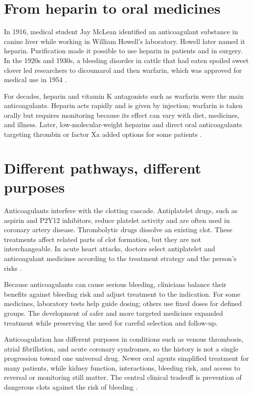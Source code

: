 \documentclass[12pt,oneside]{book}
\begin{document}
\section{From heparin to oral medicines}
In 1916, medical student Jay McLean identified an anticoagulant substance
in canine liver while working in William Howell's laboratory. Howell later
named it heparin. Purification made it possible to use heparin in patients
and in surgery. In the 1920s and 1930s, a bleeding disorder in cattle that
had eaten spoiled sweet clover led researchers to dicoumarol and then
warfarin, which was approved for medical use in 1954
\cite{anticoagulantHistory}.

For decades, heparin and vitamin K antagonists such as warfarin were the
main anticoagulants. Heparin acts rapidly and is given by injection;
warfarin is taken orally but requires monitoring because its effect can
vary with diet, medicines, and illness. Later, low-molecular-weight
heparins and direct oral anticoagulants targeting thrombin or factor Xa
added options for some patients \cite{anticoagulantHistory}.

\section{Different pathways, different purposes}
Anticoagulants interfere with the clotting cascade. Antiplatelet drugs,
such as aspirin and P2Y12 inhibitors, reduce platelet activity and are
often used in coronary artery disease. Thrombolytic drugs dissolve an
existing clot. These treatments affect related parts of clot formation,
but they are not interchangeable. In acute heart attacks, doctors select
antiplatelet and anticoagulant medicines according to the treatment
strategy and the person's risks \cite{ahaHeartAttackTreatment}.

Because anticoagulants can cause serious bleeding, clinicians balance
their benefits against bleeding risk and adjust treatment to the
indication. For some medicines, laboratory tests help guide dosing;
others use fixed doses for defined groups. The development of safer and
more targeted medicines expanded treatment while preserving the need for
careful selection and follow-up.

Anticoagulation has different purposes in conditions such as venous
thrombosis, atrial fibrillation, and acute coronary syndromes, so the history
is not a single progression toward one universal drug. Newer oral agents
simplified treatment for many patients, while kidney function, interactions,
bleeding risk, and access to reversal or monitoring still matter. The central
clinical tradeoff is prevention of dangerous clots against the risk of
bleeding \cite{anticoagulantHistory,ahaHeartAttackTreatment}.
\end{document}
